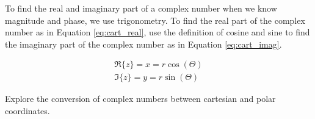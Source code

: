 \documentclass{ximera}
\begin{document}
 
 To find the real and imaginary part of a complex number when we know magnitude and phase, we use trigonometry. To find the real part of the complex number as in Equation \ref{eq:cart_real}, use the definition of cosine and sine to find the imaginary part of the complex number as in Equation \ref{eq:cart_imag}.


\begin{eqnarray}
\Re \{z\} =x= r \cos (\Theta) \label{eq:cart_real}\\
\Im \{z\} =y= r \sin (\Theta)  \label{eq:cart_imag}
\end{eqnarray}


\begin{question}
Explore the conversion of complex numbers between cartesian and polar coordinates.
\begin{center}  
\end{center} 
\end{question}
\end{document}
